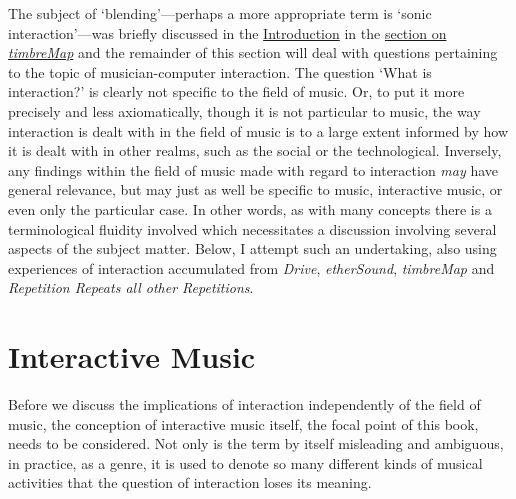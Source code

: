 The subject of `blending'---perhaps a more appropriate term is `sonic interaction'---was briefly discussed in the \hyperref[sec:introduction]{Introduction} in the \hyperref[sec:timbremap]{section on \emph{timbreMap}} and the remainder of this section will deal with questions pertaining to the topic of musician-computer interaction. The question `What is interaction?' is clearly not specific to the field of music. Or, to put it more precisely and less axiomatically, though it is not particular to music, the way interaction is dealt with in the field of music is to a large extent informed by how it is dealt with in other realms, such as the social or the technological. \hypertarget{sec:target:interraction-self-1}{Inversely, any findings} within the field of music made with regard to interaction \emph{may} have general relevance, but may just as well be specific to music, interactive music, or even only the particular case. In other words, as with many concepts there is a terminological fluidity involved which necessitates a discussion involving several aspects of the subject matter. Below, I attempt such an undertaking, also using experiences of interaction accumulated from \emph{Drive}, \emph{etherSound}, \emph{timbreMap} and \emph{Repetition Repeats all other Repetitions}.

\section{Interactive Music}
\label{sec:interactive-music}

Before we discuss the implications of interaction independently of the field of music, the conception of interactive music itself, the focal point of this book, needs to be considered. Not only is the term by itself misleading and ambiguous, in practice, as a genre, it is used to denote so many different kinds of musical activities that the question of interaction loses its meaning.

